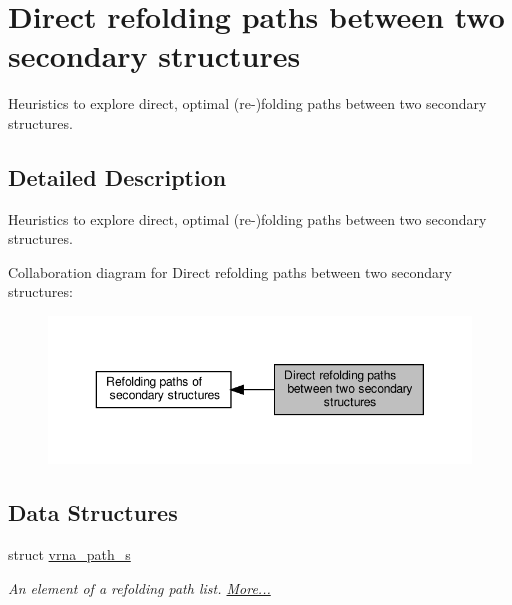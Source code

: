 \hypertarget{group__direct__paths}{}\section{Direct refolding paths between two secondary structures}
\label{group__direct__paths}


Heuristics to explore direct, optimal (re-\/)folding paths between two secondary structures.  




\subsection{Detailed Description}
Heuristics to explore direct, optimal (re-\/)folding paths between two secondary structures. 

Collaboration diagram for Direct refolding paths between two secondary structures\+:
\nopagebreak
\begin{figure}[H]
\begin{center}
\leavevmode
\includegraphics[width=350pt]{group__direct__paths}
\end{center}
\end{figure}
\subsection*{Data Structures}
\begin{DoxyCompactItemize}
\item 
struct \hyperlink{group__direct__paths_structvrna__path__s}{vrna\+\_\+path\+\_\+s}
\begin{DoxyCompactList}\small\item\em An element of a refolding path list.  \hyperlink{group__direct__paths_structvrna__path__s}{More...}\end{DoxyCompactList}\end{DoxyCompactItemize}

